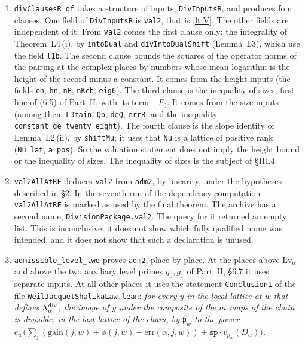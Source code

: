 \documentclass[11pt,letterpaper]{article}
\begin{document}
\begin{enumerate}[label=\textup{(\alph*)},leftmargin=2.4em,itemsep=1pt,topsep=2pt]
\item \texttt{divClausesR\_of} takes a structure of inputs, \texttt{DivInputsR}, and produces four
clauses. One field of \texttt{DivInputsR} is \texttt{val2}, that is \eqref{lt:V}. The other fields are
independent of it. From \texttt{val2} comes the first clause only: the integrality of Theorem~L4\,(i), by
\texttt{intoDual} and \texttt{divIntoDualShift} (Lemma~L3), which use the field \texttt{l1b}. The second
clause bounds the squares of the operator norms of the pairing at the complex places by numbers whose mean
logarithm is the height of the record minus a constant. It comes
from the height inputs (the fields \texttt{ch}, \texttt{hn}, \texttt{nP}, \texttt{nKcb}, \texttt{eig6}).
The third clause is the inequality of sizes, first line of (6.5) of Part~II, with its term $-F_0$. It
comes from the size inputs (among them \texttt{L3main}, \texttt{Qb}, \texttt{deQ}, \texttt{errB}, and the
inequality \texttt{constant\_ge\_twenty\_eight}). The fourth clause is the slope identity of
Lemma~L2\,(ii), by \texttt{shiftMu}; it uses that \texttt{Nu} is a lattice of positive rank
(\texttt{Nu\_lat}, \texttt{a\_pos}). So the valuation statement does not imply the height bound or the
inequality of sizes. The inequality of sizes is the subject of \S III.4.
\item \texttt{val2AllAtRF} deduces \texttt{val2} from \texttt{adm2}, by linearity, under the hypotheses
described in \S2. In the seventh run of the dependency computation \texttt{val2AllAtRF} is marked as used
by the final theorem. The archive has a second name, \texttt{DivisionPackage.val2}. The query for it
returned an empty list. This is inconclusive: it does not show which fully qualified name was intended,
and it does not show that such a declaration is unused.
\item \texttt{admissible\_level\_two} proves \texttt{adm2}, place by place. At the places above
$\mathrm{Lv}_\alpha$ and above the two auxiliary level primes $g_0,g_1$ of Part~II, \S6.7 it uses separate
inputs. At all other places it uses the statement \texttt{Conclusion1} of the file
\texttt{WeilJacquetShalikaLaw.lean}: \emph{for every $y$ in the local lattice at $w$ that defines
$\Lambda^{\rm div}_\alpha$, the image of $y$ under the composite of the $m$ maps of the chain is divisible,
in the last lattice of the chain, by $\mathfrak p_w$ to the power
$e_w\big(\sum_j(\mathrm{gain}(j,w)+\phi(j,w)-\mathrm{err}(\alpha,j,w))+\mathtt{sp}\cdot v_{p_w}(D_\alpha)\big)$.}

\end{enumerate}
\end{document}
